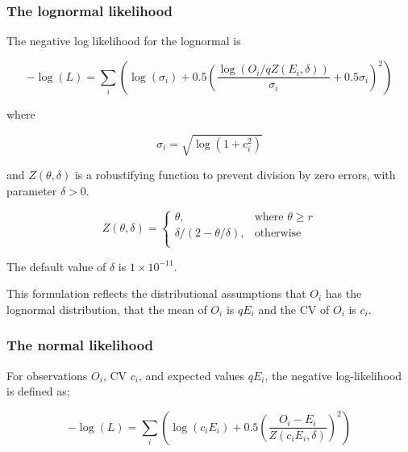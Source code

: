 \subsubsection{The lognormal likelihood  }

The negative log likelihood for the lognormal is

\begin{equation}
	- \log \left(L \right) = \sum\limits_i \left( \log \left( \sigma _i \right) + 0.5\left( \frac{\log \left(O_i / q Z \left(E_i,\delta \right) \right)}{\sigma_i} + 0.5 \sigma_i \right)^2 \right)
\end{equation}

where

\begin{equation}
	\sigma_i  = \sqrt{\log \left(1+c_i^2 \right)}
\end{equation}

and $Z \left(\theta,\delta \right)$ is a robustifying function to prevent division by zero errors, with parameter $\delta>0$.

\begin{equation}
	Z \left(\theta,\delta \right) = \begin{cases}
	\theta, & \text{where $\theta \ge r$} \\
	\delta/\left( 2-\theta/\delta \right), & \text{otherwise} \\
	\end{cases}
\end{equation}

The default value of $\delta$ is $1 \times 10^{-11}$.

This formulation reflects the distributional assumptions that  $O_i$ has the lognormal distribution, that the mean of $O_i$ is $qE_i$  and the CV of $O_i$ is $c_i$.

\subsubsection{The normal likelihood  }

For observations $O_i$, CV $c_i$, and expected values $qE_i$, the negative log-likelihood is defined as;

\begin{equation}
	- \log \left(L \right) = \sum\limits_i \left( \log \left( c_i E_i \right) +0.5 \left( \frac{O_i-E_i}{Z\left(c_i E_i,\delta \right)}\right)^2\right)
\end{equation}

